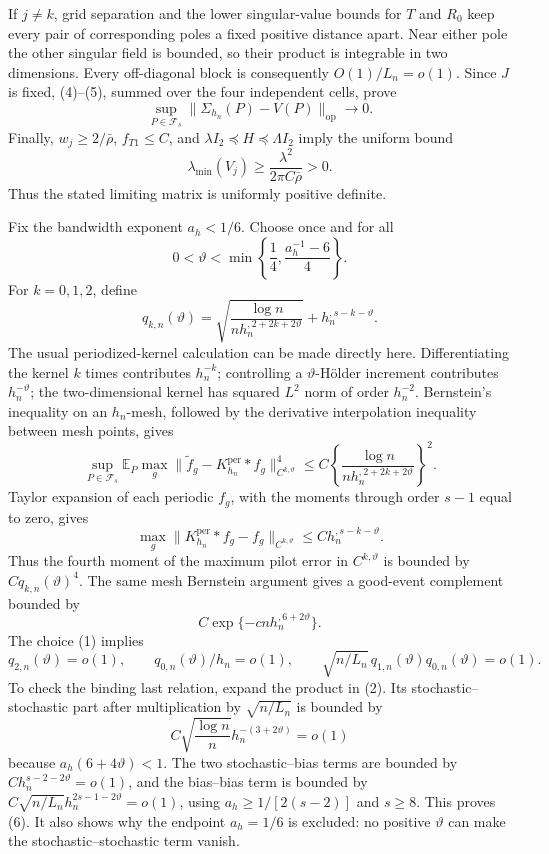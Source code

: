 If \(j\neq k\), grid separation and the lower singular-value bounds for \(T\) and \(R_0\) keep every pair of corresponding poles a fixed positive distance apart.  Near either pole the other singular field is bounded, so their product is integrable in two dimensions.  Every off-diagonal block is consequently \(O(1)/L_n=o(1)\).  Since \(J\) is fixed, (4)--(5), summed over the four independent cells, prove
\[
 \sup_{P\in\mathcal F_s}
 \|\Sigma_{h_n}(P)-V(P)\|_{\mathrm{op}}\longrightarrow0.             \tag{6}
\]
Finally, \(w_j\geq 2/\bar\rho\), \(f_{T1}\leq C\), and
\(\lambda I_2\preceq H\preceq\Lambda I_2\) imply the uniform bound
\[
 \lambda_{\min}(V_j)
 \geq\frac{\lambda^2}{2\pi C\bar\rho}>0.                            \tag{7}
\]
Thus the stated limiting matrix is uniformly positive definite.

Fix the bandwidth exponent \(a_h<1/6\).  Choose once and for all
\[
 0<\vartheta<\min\left\{\frac14,\frac{a_h^{-1}-6}{4}\right\}.        \tag{1}
\]
For \(k=0,1,2\), define
\[
 q_{k,n}(\vartheta)=
 \sqrt{\frac{\log n}{n h_n^{,2+2k+2\vartheta}}}
 +h_n^{,s-k-\vartheta}.                                               \tag{2}
\]
The usual periodized-kernel calculation can be made directly here.  Differentiating the kernel \(k\) times contributes \(h_n^{-k}\); controlling a \(\vartheta\)-H\"older increment contributes \(h_n^{-\vartheta}\); the two-dimensional kernel has squared \(L^2\) norm of order \(h_n^{-2}\).  Bernstein's inequality on an \(h_n\)-mesh, followed by the derivative interpolation inequality between mesh points, gives
\[
 \sup_{P\in\mathcal F_s}
 \mathbb E_P\max_g
 \|\widetilde f_g-K_{h_n}^{\mathrm{per}}*f_g\|_{C^{k,\vartheta}}^4
 \leq C\left\{\frac{\log n}
 {n h_n^{,2+2k+2\vartheta}}\right\}^2.                               \tag{3}
\]
Taylor expansion of each periodic \(f_g\), with the moments through order \(s-1\) equal to zero, gives
\[
 \max_g\|K_{h_n}^{\mathrm{per}}*f_g-f_g\|_{C^{k,\vartheta}}
 \leq Ch_n^{,s-k-\vartheta}.                                        \tag{4}
\]
Thus the fourth moment of the maximum pilot error in \(C^{k,\vartheta}\) is bounded by \(Cq_{k,n}(\vartheta)^4\).  The same mesh Bernstein argument gives a good-event complement bounded by
\[
 C\exp\{-cnh_n^{,6+2\vartheta}\}.                                   \tag{5}
\]
The choice (1) implies
\[
 q_{2,n}(\vartheta)=o(1),\qquad
 q_{0,n}(\vartheta)/h_n=o(1),\qquad
 \sqrt{n/L_n}\,q_{1,n}(\vartheta)q_{0,n}(\vartheta)=o(1).             \tag{6}
\]
To check the binding last relation, expand the product in (2).  Its stochastic--stochastic part after multiplication by \(\sqrt{n/L_n}\) is bounded by
\[
 C\sqrt{\frac{\log n}{n}}h_n^{-(3+2\vartheta)}=o(1)
\]
because \(a_h(6+4\vartheta)<1\).  The two stochastic--bias terms are bounded by \(Ch_n^{s-2-2\vartheta}=o(1)\), and the bias--bias term is bounded by
\(C\sqrt{n/L_n}h_n^{2s-1-2\vartheta}=o(1)\), using
\(a_h\geq1/[2(s-2)]\) and \(s\geq8\).  This proves (6).  It also shows why the endpoint \(a_h=1/6\) is excluded: no positive \(\vartheta\) can make the stochastic--stochastic term vanish.

